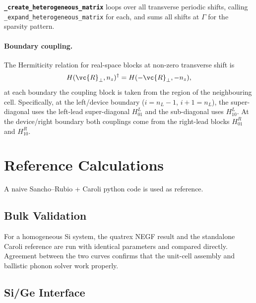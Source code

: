 \textbf{\texttt{\_create\_heterogeneous\_matrix}} loops over all
transverse periodic shifts, calling
\\\texttt{\_expand\_heterogeneous\_matrix} for each, and sums all shifts
at $\Gamma$ for the sparsity pattern.


\paragraph{Boundary coupling.}
The Hermiticity relation for real-space blocks at non-zero transverse
shift is
\begin{equation}\label{eq:hermiticity_perp}
  H(\vc{R}_\perp, n_z)^\dagger = H(-\vc{R}_\perp, -n_z),
\end{equation}
at each boundary the coupling block is taken from the region of the neighbouring
cell.  Specifically, at the left/device boundary ($i = n_L - 1$,
$i+1 = n_L$), the super-diagonal uses the left-lead super-diagonal
$H_{01}^L$ and the sub-diagonal uses $H_{10}^L$.  At the
device/right boundary both couplings come from the right-lead blocks
$H_{01}^R$ and $H_{10}^R$.


\section{Reference Calculations}
\label{sec:validation}

A naive Sancho--Rubio + Caroli python code is used as reference.


\subsection{Bulk Validation}
\label{sec:bulk_validation}

For a homogeneous Si system, the quatrex NEGF result and the
standalone Caroli reference are run with identical parameters and
compared directly.  Agreement between the two curves confirms that the
unit-cell assembly and ballistic phonon solver work properly.


\subsection{Si/Ge Interface}
\label{sec:sige}


